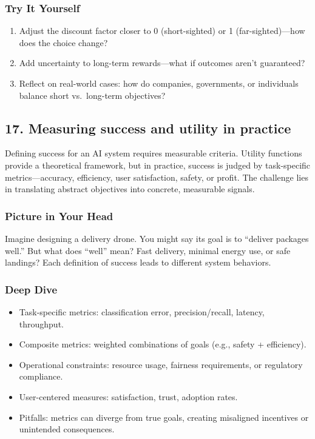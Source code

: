\documentclass[
  letterpaper,
  DIV=11,
  numbers=noendperiod]{scrreprt}
\providecommand{\tightlist}{%
  \setlength{\itemsep}{0pt}\setlength{\parskip}{0pt}}
\begin{document}
\subsubsection{Try It Yourself}\label{try-it-yourself-15}

\begin{enumerate}
\def\labelenumi{\arabic{enumi}.}
\tightlist
\item
  Adjust the discount factor closer to 0 (short-sighted) or 1
  (far-sighted)---how does the choice change?
\item
  Add uncertainty to long-term rewards---what if outcomes aren't
  guaranteed?
\item
  Reflect on real-world cases: how do companies, governments, or
  individuals balance short vs.~long-term objectives?
\end{enumerate}

\subsection{17. Measuring success and utility in
practice}\label{measuring-success-and-utility-in-practice}

Defining success for an AI system requires measurable criteria. Utility
functions provide a theoretical framework, but in practice, success is
judged by task-specific metrics---accuracy, efficiency, user
satisfaction, safety, or profit. The challenge lies in translating
abstract objectives into concrete, measurable signals.

\subsubsection{Picture in Your Head}\label{picture-in-your-head-16}

Imagine designing a delivery drone. You might say its goal is to
``deliver packages well.'' But what does ``well'' mean? Fast delivery,
minimal energy use, or safe landings? Each definition of success leads
to different system behaviors.

\subsubsection{Deep Dive}\label{deep-dive-16}

\begin{itemize}
\tightlist
\item
  Task-specific metrics: classification error, precision/recall,
  latency, throughput.
\item
  Composite metrics: weighted combinations of goals (e.g., safety +
  efficiency).
\item
  Operational constraints: resource usage, fairness requirements, or
  regulatory compliance.
\item
  User-centered measures: satisfaction, trust, adoption rates.
\item
  Pitfalls: metrics can diverge from true goals, creating misaligned
  incentives or unintended consequences.
\end{itemize}
\end{document}
